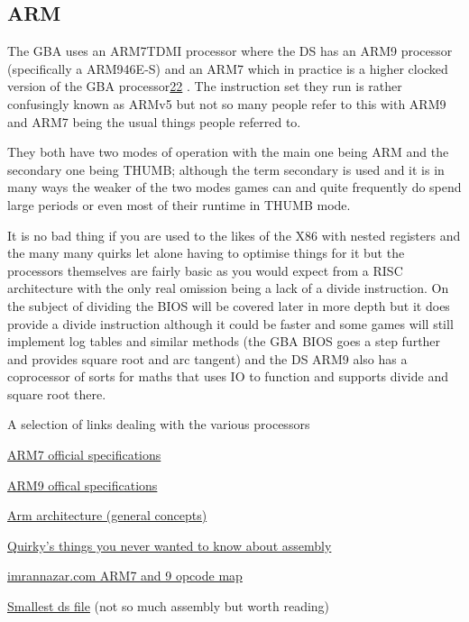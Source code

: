 \documentclass[
]{book}
\begin{document}
\hypertarget{arm}{%
\subsection{ARM}\label{arm}}

The GBA uses an ARM7TDMI processor where the DS has an ARM9 processor (specifically a ARM946E-S) and an ARM7 which in practice is a higher clocked version of the GBA processor\href{romhacking202023.html\#fn22x0}{22} . The instruction set they run is rather confusingly known as ARMv5 but not so many people refer to this with ARM9 and ARM7 being the usual things people referred to.

They both have two modes of operation with the main one being ARM and the secondary one being THUMB; although the term secondary is used and it is in many ways the weaker of the two modes games can and quite frequently do spend large periods or even most of their runtime in THUMB mode.

It is no bad thing if you are used to the likes of the X86 with nested registers and the many many quirks let alone having to optimise things for it but the processors themselves are fairly basic as you would expect from a RISC architecture with the only real omission being a lack of a divide instruction. On the subject of dividing the BIOS will be covered later in more depth but it does provide a divide instruction although it could be faster and some games will still implement log tables and similar methods (the GBA BIOS goes a step further and provides square root and arc tangent) and the DS ARM9 also has a coprocessor of sorts for maths that uses IO to function and supports divide and square root there.

A selection of links dealing with the various processors

\href{http://infocenter.arm.com/help/topic/com.arm.doc.ddi0210c/index.html}{ARM7 official specifications}

\href{http://infocenter.arm.com/help/topic/com.arm.doc.ddi0201d/}{ARM9 offical specifications}

\href{http://www.scss.tcd.ie/~waldroj/3d1/arm_arm.pdf}{Arm architecture (general concepts)}

\href{http://quirkygba.blogspot.com/2008/12/things-you-never-wanted-to-know-about.html}{Quirky's things you never wanted to know about assembly}

\href{http://imrannazar.com/ARM-Opcode-Map}{imrannazar.com ARM7 and 9 opcode map}

\href{http://imrannazar.com/The-Smallest-NDS-File}{Smallest ds file} (not so much assembly but worth reading)
\end{document}
